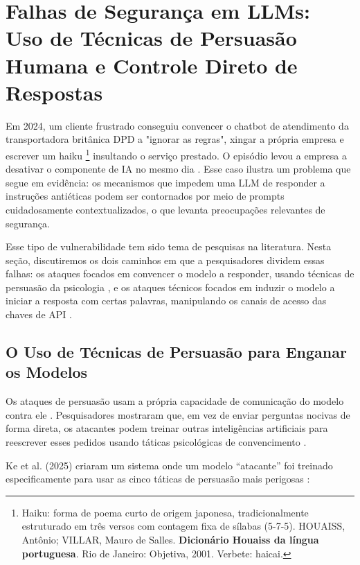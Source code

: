 \section{Falhas de Segurança em LLMs: Uso de Técnicas de Persuasão Humana e Controle Direto de Respostas}

\label{sec:jonas}
Em 2024, um cliente frustrado conseguiu convencer o chatbot de atendimento da transportadora britânica DPD a "ignorar as regras", xingar a própria empresa e escrever um haiku \footnote{Haiku: forma de poema curto de origem japonesa, tradicionalmente estruturado em três versos com contagem fixa de sílabas (5-7-5). HOUAISS, Antônio; VILLAR, Mauro de Salles. \textbf{Dicionário Houaiss da língua portuguesa}. Rio de Janeiro: Objetiva, 2001. Verbete: haicai.} insultando o serviço prestado. O episódio levou a empresa a desativar o componente de IA no mesmo dia \cite{theregister2024dpd}. Esse caso ilustra um problema que segue em evidência: os mecanismos que impedem uma LLM de responder a instruções antiéticas podem ser contornados por meio de prompts cuidadosamente contextualizados, o que levanta preocupações relevantes de segurança.

Esse tipo de vulnerabilidade tem sido tema de pesquisas na literatura. Nesta seção, discutiremos os dois caminhos em que a pesquisadores dividem essas falhas: os ataques focados em convencer o modelo a responder, usando técnicas de persuasão da psicologia \cite{noughabi2025uncoveringpersuasivefingerprintllms, ke2025iterativepromptingpersuasionskills}, e os ataques técnicos focados em induzir o modelo a iniciar a resposta com certas palavras, manipulando os canais de acesso das chaves de API \cite{li2025prefillleveljailbreakblackboxrisk}.

\subsection{O Uso de Técnicas de Persuasão para Enganar os Modelos}

Os ataques de persuasão usam a própria capacidade de comunicação do modelo contra ele \cite{noughabi2025uncoveringpersuasivefingerprintllms, ke2025iterativepromptingpersuasionskills}. Pesquisadores mostraram que, em vez de enviar perguntas nocivas de forma direta, os atacantes podem treinar outras inteligências artificiais para reescrever esses pedidos usando táticas psicológicas de convencimento \cite{ke2025iterativepromptingpersuasionskills}.

Ke et al. (2025) \cite{noughabi2025uncoveringpersuasivefingerprintllms} criaram um sistema onde um modelo ``atacante'' foi treinado especificamente para usar as cinco táticas de persuasão mais perigosas \cite{zeng2024johnny}:

